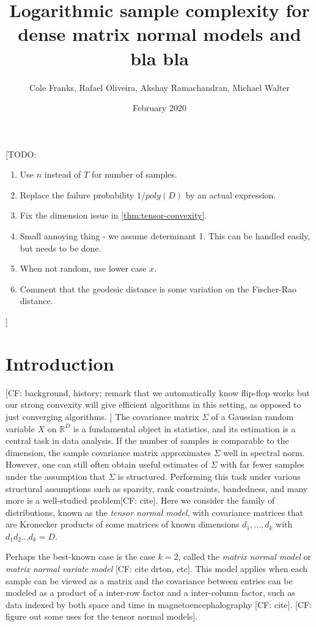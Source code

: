 \documentclass{article}
\title{Logarithmic sample complexity for dense matrix normal models and bla bla}
\author{Cole Franks, Rafael Oliveira, Akshay Ramachandran, Michael Walter}
\date{February 2020}
\newcommand{\R}{{\mathbb{R}}}
\newcommand{\CF}[1]{{\color{purple}[CF: #1]}}
\newcommand{\TODO}[1]{{\color{blue}[TODO: #1]}}
\begin{document}
\maketitle
\tableofcontents
\TODO{
\begin{enumerate}
\item Use $n$ instead of $T$ for number of samples.
\item Replace the failure probability $1/poly(D)$ by an actual expression.
\item Fix the dimension issue in \cref{thm:tensor-convexity}.
\item Small annoying thing - we assume determinant 1. This can be handled easily, but needs to be done.
\item When not random, use lower case $x$.
\item Comment that the geodesic distance is some variation on the Fischer-Rao distance.
\end{enumerate}

}


\section{Introduction}
\CF{background, history; remark that we automatically know flip-flop works but our strong convexity will give efficient algorithms in this setting, as opposed to just converging algorithms. }
The covariance matrix $\Sigma$ of a Gaussian random variable $X$ on $\R^D$ is a fundamental object in statistics, and its estimation is a central task in data analysis. If the number of samples is comparable to the dimension, the sample covariance matrix approximates $\Sigma$ well in spectral norm. However, one can still often obtain useful estimates of $\Sigma$ with far fewer samples under the assumption that $\Sigma$ is structured. Performing this task under various structural assumptions such as sparsity, rank constraints, bandedness, and many more is a well-studied problem\CF{cite}. Here we consider the family of distributions, known as the \emph{tensor normal model}, with covariance matrices that are Kronecker products of some matrices of known dimensions $d_1, \dots, d_k$ with $d_1d_2\dots d_k = D$.

Perhaps the best-known case is the case $k = 2$, called the \emph{matrix normal model} or  \emph{matrix normal variate model} \CF{cite drton, etc}. This model applies when each sample can be viewed as a matrix and the covariance between entries can be modeled as a product of a inter-row factor and a inter-column factor, such as data indexed by both space and time in magnetoencephalography \CF{cite}. \CF{figure out some uses for the tensor normal models}.
\end{document}

